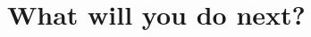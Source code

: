 \documentclass[sigconf]{acmart}
\begin{document}

\section{What will you do next?}
\begin{comment}

Scaling up


Funding 


Shared CPD learning materials


Address EDI issues in computer science


Reverse mentoring


Align with BCS


Special interest group

Web space for repository and functionality (mentoring, buddying) to store CPD sessions, shared resources for new CS academics, examples of good practice and a discussion space.

Explore what BCS are doing with professionals in non academic roles

Encourage research on pedagogy and educational issues in CS

Examine if programme framework is transferrable to other disciplines
\end{comment}
\end{document}
